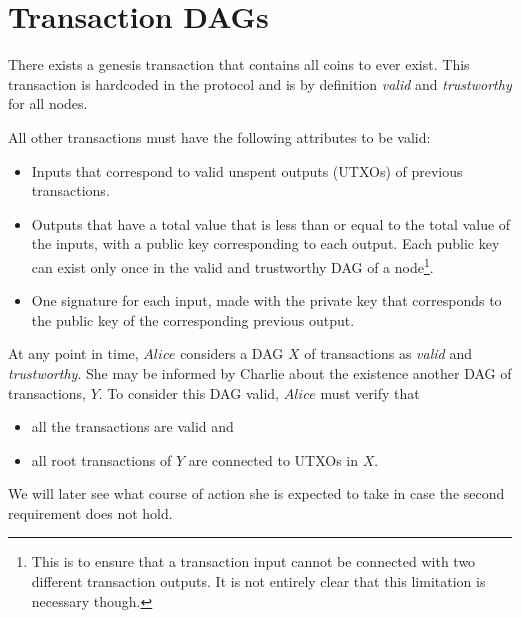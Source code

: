 \section{Transaction DAGs}
  There exists a genesis transaction that contains all coins to ever exist. This
  transaction is hardcoded in the protocol and is by definition \textit{valid} and
  \textit{trustworthy} for all nodes.
  \begin{center}
    \begin{dot2tex}[outputdir=dot2tex/, file=coinbase]
      
    \end{dot2tex}
  \end{center}
  All other transactions must have the following attributes to be valid:
  \begin{itemize}
    \item Inputs that correspond to valid unspent outputs (UTXOs) of previous
    transactions.
    \item Outputs that have a total value that is less than or equal to the total value of
      the inputs, with a public key corresponding to each output. Each public key can
      exist only once in the valid and trustworthy DAG of a node\footnote{This is to
      ensure that a transaction input cannot be connected with two different transaction
      outputs. It is not entirely clear that this limitation is necessary though.}.
    \item One signature for each input, made with the private key that corresponds to the
      public key of the corresponding previous output.
  \end{itemize}
  At any point in time, $Alice$ considers a DAG $X$ of transactions as \textit{valid} and
  \textit{trustworthy}. She may be informed by Charlie about the existence another DAG of
  transactions, $Y$. To consider this DAG valid, $Alice$ must verify that
  \begin{itemize}
    \item all the transactions are valid and
    \item all root transactions of $Y$ are connected to UTXOs in $X$.
  \end{itemize}
  We will later see what course of action she is expected to take in case the second
  requirement does not hold.


